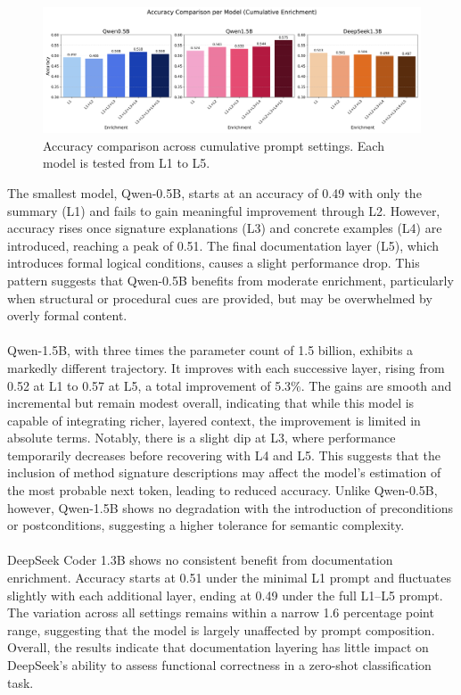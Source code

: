\documentclass[a4paper]{usiinfbachelorproject}
\begin{document}
\begin{figure}[H]
  \centering
  \includegraphics[width=\linewidth]{./figures/accuracy_comparison.png}
  \caption{Accuracy comparison across cumulative prompt settings. Each model is tested from L1 to L5.}
  \label{fig:acc-l1-l5}
\end{figure}
\noindent
The smallest model, Qwen-0.5B, starts at an accuracy of 0.49 with only the summary (L1) and fails to gain meaningful improvement through L2. However, accuracy rises once signature explanations (L3) and concrete examples (L4) are introduced, reaching a peak of 0.51. The final documentation layer (L5), which introduces formal logical conditions, causes a slight performance drop. This pattern suggests that Qwen-0.5B benefits from moderate enrichment, particularly when structural or procedural cues are provided, but may be overwhelmed by overly formal content. \\
\\
Qwen-1.5B, with three times the parameter count of 1.5 billion, exhibits a markedly different trajectory. It improves with each successive layer, rising from 0.52 at L1 to 0.57 at L5, a total improvement of 5.3\%. The gains are smooth and incremental but remain modest overall, indicating that while this model is capable of integrating richer, layered context, the improvement is limited in absolute terms. Notably, there is a slight dip at L3, where performance temporarily decreases before recovering with L4 and L5. This suggests that the inclusion of method signature descriptions may affect the model’s estimation of the most probable next token, leading to reduced accuracy. Unlike Qwen-0.5B, however, Qwen-1.5B shows no degradation with the introduction of preconditions or postconditions, suggesting a higher tolerance for semantic complexity. \\
\\
DeepSeek Coder 1.3B shows no consistent benefit from documentation enrichment. Accuracy starts at 0.51 under the minimal L1 prompt and fluctuates slightly with each additional layer, ending at 0.49 under the full L1–L5 prompt. The variation across all settings remains within a narrow 1.6 percentage point range, suggesting that the model is largely unaffected by prompt composition. Overall, the results indicate that documentation layering has little impact on DeepSeek’s ability to assess functional correctness in a zero-shot classification task.
\end{document}
